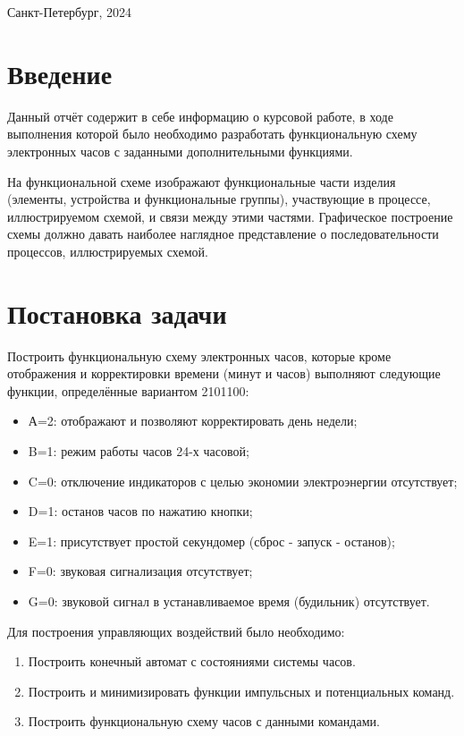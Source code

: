 \documentclass[a4paper, final]{article}
\begin{document}
\hfill \break
\hfill \break
\begin{center} \small{Санкт-Петербург, 2024} \end{center}
\thispagestyle{empty} %

\newpage

\tableofcontents

\newpage

\cleardoublepage
{}
{}
\section*{Введение}
Данный отчёт содержит в себе информацию о курсовой работе, в ходе выполнения которой было необходимо разработать функциональную схему электронных часов с заданными дополнительными функциями.

На функциональной схеме изображают функциональные части изделия (элементы, устройства и функциональные группы), участвующие в процессе, иллюстрируемом схемой, и связи между этими частями. Графическое построение схемы должно давать наиболее наглядное представление о последовательности процессов, иллюстрируемых схемой.

\newpage
\section{Постановка задачи}
Построить функциональную схему электронных часов, которые кроме отображения и корректировки времени (минут и часов) выполняют следующие функции, определённые вариантом 2101100:
\begin{itemize}
  \item А=2: отображают и позволяют корректировать день недели;
  \item B=1: режим работы часов 24-х часовой;
  \item C=0: отключение индикаторов с целью экономии электроэнергии отсутствует; 
  \item D=1: останов часов по нажатию кнопки;
  \item E=1: присутствует простой секундомер (сброс - запуск - останов);
  \item F=0: звуковая сигнализация отсутствует; 
  \item G=0: звуковой сигнал в устанавливаемое время (будильник) отсутствует.
\end{itemize}

\noindent Для построения управляющих воздействий было необходимо:
\begin{enumerate}
  \item Построить конечный автомат с состояниями системы часов.
  \item Построить и минимизировать функции импульсных и потенциальных команд.
  \item Построить функциональную схему часов с данными командами.
\end{enumerate}
\end{document}
